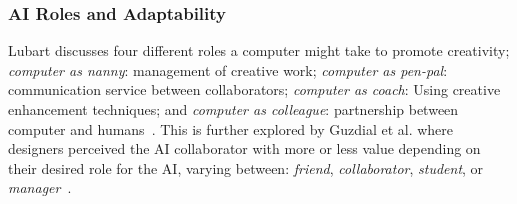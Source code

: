 


\subsubsection{AI Roles and Adaptability}


Lubart discusses four different roles a computer might take to promote creativity; \emph{computer as nanny}: management of creative work; \emph{computer as pen-pal}: communication service between collaborators; \emph{computer as coach}: Using creative enhancement techniques; and \emph{computer as colleague}: partnership between computer and humans~. This is further explored by Guzdial et al. where designers perceived the AI collaborator with more or less value depending on their desired role for the AI, varying between: \emph{friend}, \emph{collaborator}, \emph{student}, or \emph{manager}~.

